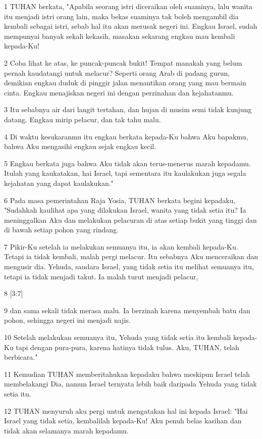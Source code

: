 \par 1 TUHAN berkata, "Apabila seorang istri diceraikan oleh suaminya, lalu wanita itu menjadi istri orang lain, maka bekas suaminya tak boleh mengambil dia kembali sebagai istri, sebab hal itu akan merusak negeri ini. Engkau Israel, sudah mempunyai banyak sekali kekasih, masakan sekarang engkau mau kembali kepada-Ku!
\par 2 Coba lihat ke atas, ke puncak-puncak bukit! Tempat manakah yang belum pernah kaudatangi untuk melacur? Seperti orang Arab di padang gurun, demikian engkau duduk di pinggir jalan menantikan orang yang mau bermain cinta. Engkau menajiskan negeri ini dengan perzinahan dan kejahatanmu.
\par 3 Itu sebabnya air dari langit tertahan, dan hujan di musim semi tidak kunjung datang. Engkau mirip pelacur, dan tak tahu malu.
\par 4 Di waktu kesukaranmu itu engkau berkata kepada-Ku bahwa Aku bapakmu, bahwa Aku mengasihi engkau sejak engkau kecil.
\par 5 Engkau berkata juga bahwa Aku tidak akan terus-menerus marah kepadamu. Itulah yang kaukatakan, hai Israel, tapi sementara itu kaulakukan juga segala kejahatan yang dapat kaulakukan."
\par 6 Pada masa pemerintahan Raja Yosia, TUHAN berkata begini kepadaku, "Sudahkah kaulihat apa yang dilakukan Israel, wanita yang tidak setia itu? Ia meninggalkan Aku dan melakukan pelacuran di atas setiap bukit yang tinggi dan di bawah setiap pohon yang rindang.
\par 7 Pikir-Ku setelah ia melakukan semuanya itu, ia akan kembali kepada-Ku. Tetapi ia tidak kembali, malah pergi melacur. Itu sebabnya Aku menceraikan dan mengusir dia. Yehuda, saudara Israel, yang tidak setia itu melihat semuanya itu, tetapi ia tidak menjadi takut. Ia malah turut menjadi pelacur,
\par 8 [3:7]
\par 9 dan sama sekali tidak merasa malu. Ia berzinah karena menyembah batu dan pohon, sehingga negeri ini menjadi najis.
\par 10 Setelah melakukan semuanya itu, Yehuda yang tidak setia itu kembali kepada-Ku tapi dengan pura-pura, karena hatinya tidak tulus. Aku, TUHAN, telah berbicara."
\par 11 Kemudian TUHAN memberitahukan kepadaku bahwa meskipun Israel telah membelakangi Dia, namun Israel ternyata lebih baik daripada Yehuda yang tidak setia itu.
\par 12 TUHAN menyuruh aku pergi untuk mengatakan hal ini kepada Israel: "Hai Israel yang tidak setia, kembalilah kepada-Ku! Aku penuh belas kasihan dan tidak akan selamanya marah kepadamu.
